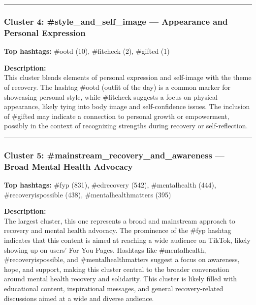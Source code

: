 \documentclass[
]{article}
\begin{document}
\begin{center}\rule{0.5\linewidth}{0.5pt}\end{center}

\subsubsection{Cluster 4: \#style\_and\_self\_image --- Appearance and
Personal
Expression}\label{cluster-4-style_and_self_image-appearance-and-personal-expression}

\textbf{Top hashtags:} \#ootd (10), \#fitcheck (2), \#gifted (1)

\textbf{Description:}\\

This cluster blends elements of personal expression and self-image with
the theme of recovery. The hashtag \#ootd (outfit of the day) is a
common marker for showcasing personal style, while \#fitcheck suggests a
focus on physical appearance, likely tying into body image and
self-confidence issues. The inclusion of \#gifted may indicate a
connection to personal growth or empowerment, possibly in the context of
recognizing strengths during recovery or self-reflection.

\begin{center}\rule{0.5\linewidth}{0.5pt}\end{center}

\subsubsection{Cluster 5: \#mainstream\_recovery\_and\_awareness ---
Broad Mental Health
Advocacy}\label{cluster-5-mainstream_recovery_and_awareness-broad-mental-health-advocacy}

\textbf{Top hashtags:} \#fyp (831), \#edrecovery (542), \#mentalhealth
(444), \#recoveryispossible (438), \#mentalhealthmatters (395)

\textbf{Description:}\\

The largest cluster, this one represents a broad and mainstream approach
to recovery and mental health advocacy. The prominence of the \#fyp
hashtag indicates that this content is aimed at reaching a wide audience
on TikTok, likely showing up on users' For You Pages. Hashtags like
\#mentalhealth, \#recoveryispossible, and \#mentalhealthmatters suggest
a focus on awareness, hope, and support, making this cluster central to
the broader conversation around mental health recovery and solidarity.
This cluster is likely filled with educational content, inspirational
messages, and general recovery-related discussions aimed at a wide and
diverse audience.
\end{document}
